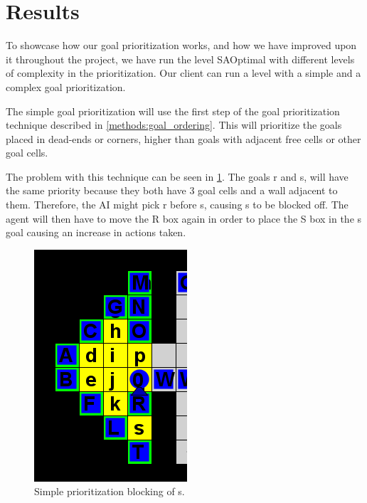 \section{Results}
\label{sec:results}


To showcase how our goal prioritization works, and how we have improved upon it throughout the project, we have run the level SAOptimal with different levels of complexity in the prioritization.
Our client can run a level with a simple and a complex goal prioritization. 

The simple goal prioritization will use the first step of the goal prioritization technique described in \cref{methods:goal_ordering}. 
This will prioritize the goals placed in dead-ends or corners, higher than goals with adjacent free cells or other goal cells.

The problem with this technique can be seen in \cref{fig:SAOptimal}. 
The goals r and s, will have the same priority because they both have 3 goal cells and a wall adjacent to them. 
Therefore, the AI might pick r before s, causing s to be blocked off. 
The agent will then have to move the R box again in order to place the S box in the s goal causing an increase in actions taken.

\begin{figure}[h!]
  \centering
  \includegraphics[width=.5\columnwidth]{graphics/simple_priority_block.png}
  \caption{\label{fig:SAOptimal}Simple prioritization blocking of s.}
\end{figure}

